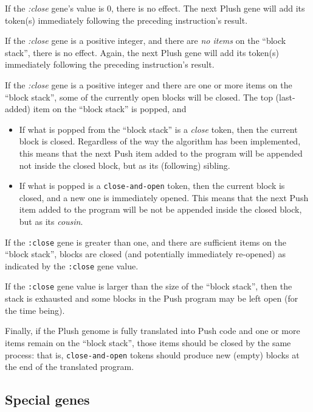 If the \textit{:close} gene's value is 0, there is no effect. The next Plush gene will add its token(s) immediately following the preceding instruction's result.

If the \textit{:close} gene is a positive integer, and there are \textit{no items} on the ``block stack'', there is no effect. Again, the next Plush gene will add its token(s) immediately following the preceding instruction's result.

If the \textit{:close} gene is a positive integer and there are one or more items on the ``block stack'', some of the currently open blocks will be closed. The top (last-added) item on the ``block stack'' is popped, and

\begin{itemize}

\item If what is popped from the ``block stack'' is a \textit{close} token, then the current block is closed. Regardless of the way the algorithm has been implemented, this means that the next Push item added to the program will be appended not inside the closed block, but as its (following) sibling.
\item If what is popped is a \texttt{close-and-open} token, then the current block is closed, and a new one is immediately opened. This means that the next Push item added to the program will be not be appended inside the closed block, but as its \textit{cousin}.
\end{itemize}

If the \texttt{:close} gene is greater than one, and there are sufficient items on the ``block stack'', blocks are closed (and potentially immediately re-opened) as indicated by the \texttt{:close} gene value.

If the \texttt{:close} gene value is larger than the size of the ``block stack'', then the stack is exhausted and some blocks in the Push program may be left open (for the time being).

Finally, if the Plush genome is fully translated into Push code and one or more items remain on the ``block stack'', those items should be closed by the same process: that is, \texttt{close-and-open} tokens should produce new (empty) blocks at the end of the translated program.

\subsection{Special genes}
\label{special-instructions}

